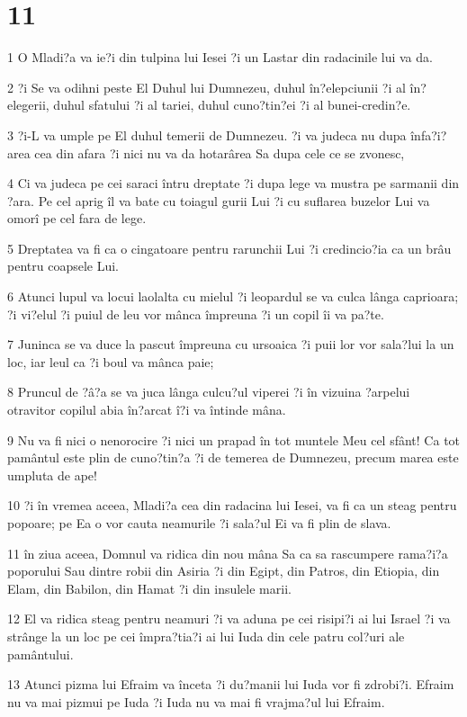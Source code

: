 \chapter{11}

\par 1 O Mladi?a va ie?i din tulpina lui Iesei ?i un Lastar din radacinile lui va da.
\par 2 ?i Se va odihni peste El Duhul lui Dumnezeu, duhul în?elepciunii ?i al în?elegerii, duhul sfatului ?i al tariei, duhul cuno?tin?ei ?i al bunei-credin?e.
\par 3 ?i-L va umple pe El duhul temerii de Dumnezeu. ?i va judeca nu dupa înfa?i?area cea din afara ?i nici nu va da hotarârea Sa dupa cele ce se zvonesc,
\par 4 Ci va judeca pe cei saraci întru dreptate ?i dupa lege va mustra pe sarmanii din ?ara. Pe cel aprig îl va bate cu toiagul gurii Lui ?i cu suflarea buzelor Lui va omorî pe cel fara de lege.
\par 5 Dreptatea va fi ca o cingatoare pentru rarunchii Lui ?i credincio?ia ca un brâu pentru coapsele Lui.
\par 6 Atunci lupul va locui laolalta cu mielul ?i leopardul se va culca lânga caprioara; ?i vi?elul ?i puiul de leu vor mânca împreuna ?i un copil îi va pa?te.
\par 7 Juninca se va duce la pascut împreuna cu ursoaica ?i puii lor vor sala?lui la un loc, iar leul ca ?i boul va mânca paie;
\par 8 Pruncul de ?â?a se va juca lânga culcu?ul viperei ?i în vizuina ?arpelui otravitor copilul abia în?arcat î?i va întinde mâna.
\par 9 Nu va fi nici o nenorocire ?i nici un prapad în tot muntele Meu cel sfânt! Ca tot pamântul este plin de cuno?tin?a ?i de temerea de Dumnezeu, precum marea este umpluta de ape!
\par 10 ?i în vremea aceea, Mladi?a cea din radacina lui Iesei, va fi ca un steag pentru popoare; pe Ea o vor cauta neamurile ?i sala?ul Ei va fi plin de slava.
\par 11 în ziua aceea, Domnul va ridica din nou mâna Sa ca sa rascumpere rama?i?a poporului Sau dintre robii din Asiria ?i din Egipt, din Patros, din Etiopia, din Elam, din Babilon, din Hamat ?i din insulele marii.
\par 12 El va ridica steag pentru neamuri ?i va aduna pe cei risipi?i ai lui Israel ?i va strânge la un loc pe cei împra?tia?i ai lui Iuda din cele patru col?uri ale pamântului.
\par 13 Atunci pizma lui Efraim va înceta ?i du?manii lui Iuda vor fi zdrobi?i. Efraim nu va mai pizmui pe Iuda ?i Iuda nu va mai fi vrajma?ul lui Efraim.

